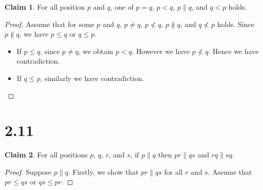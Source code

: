 \documentclass[autodetect-engine]{article}
\theoremstyle{plain}
\theoremstyle{definition}
\theoremstyle{definition}
\newtheorem*{claim}{Claim}
\begin{document}
\begin{claim}
    For all position $p$ and $q$, one of $p=q$, $p < q$, $p \parallel q$, and $q < p$ holds.
\end{claim}

\begin{proof}
    Assume that for some $p$ and $q$,
    $p\neq q$, $p \nless q$, $p \nparallel q$, and $q \nless p$ holds.
    Since $p \nparallel q$, we have $p \leqslant q$ or $q \leqslant p$.
    \begin{itemize}
        \item If $p \leqslant q$, since $p \neq q$, we obtain $p < q$.
            However we have $p \nless q$. Hence we have contradiction.
        \item If $q \leqslant p$, similarly we have contradiction.
    \end{itemize}
\end{proof}

\section*{2.11}

\begin{claim}
    For all positions $p$, $q$, $r$, and $s$,
    if $p \parallel q$ then $pr \parallel qs$ and $rq \parallel sq$.
\end{claim}

\begin{proof}
    Suppose $p \parallel q$. Firstly, we show that $pr \parallel qs$ for all $r$ and $s$.
    Assume that $pr \leq qs$ or $qs \leq pr$.
    
\end{proof}


\end{document}
